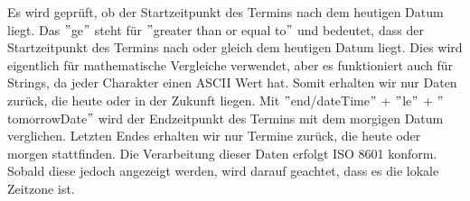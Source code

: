 Es wird geprüft, ob der Startzeitpunkt des Termins nach dem heutigen Datum liegt.
Das \("\)ge\("\) steht für \("\)greater than or equal to\("\) und bedeutet, dass der Startzeitpunkt des Termins nach oder gleich dem heutigen Datum liegt.
Dies wird eigentlich für mathematische Vergleiche verwendet, aber es funktioniert auch für Strings, da jeder Charakter einen ASCII Wert hat.
\newline
Somit erhalten wir nur Daten zurück, die heute oder in der Zukunft liegen.
\newline
Mit \("\)end/dateTime\("\) + \("\)le\("\) + \("\) {tomorrowDate}\("\) wird der Endzeitpunkt des Termins mit dem morgigen Datum verglichen.
Letzten Endes erhalten wir nur Termine zurück, die heute oder morgen stattfinden.
Die Verarbeitung dieser Daten erfolgt ISO 8601 konform.
Sobald diese jedoch angezeigt werden, wird darauf geachtet, dass es die lokale Zeitzone ist.
\newline
